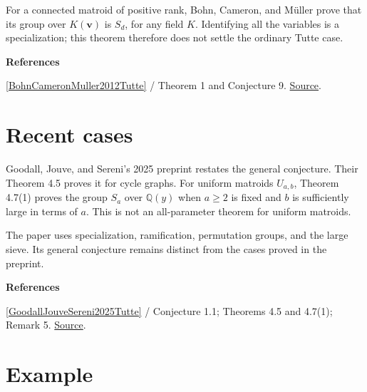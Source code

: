 \documentclass[11pt,a4paper,oneside,openany]{book}
\newcommand{\atlasdisplay}[1]{\par\begingroup\centering\vspace{3pt}\noindent\adjustbox{max width=\linewidth}{\(\displaystyle #1\)}\par\vspace{5pt}\endgroup}
\newenvironment{sources}{\par\smallskip\begingroup\footnotesize\color{atlasgray}\leftskip=10pt\setlength{\parskip}{2pt}}{\par\endgroup\smallskip}
\begin{document}
\atlasdisplay{\widehat Z_M(q,\mathbf v)=\sum_{A\subseteq E}q^{d-r(A)}\prod_{e\in A}v_e.}
\color{black} For a connected matroid of positive rank, Bohn, Cameron, and Müller prove that its group over \(K(\mathbf v)\) is \(S_d\), for any field \(K\). Identifying all the variables is a specialization; this theorem therefore does not settle the ordinary Tutte case.\par
\begin{sources}
\textbf{References}\par\smallskip
\noindent\hyperlink{ref:BohnCameronMuller2012Tutte}{[BohnCameronMuller2012Tutte]} / Theorem 1 and Conjecture 9.  \href{https://doi.org/10.1007/s10801-011-0332-2}{Source}.\par
\end{sources}\color{black}
\section{Recent cases}
\color{black} Goodall, Jouve, and Sereni's 2025 preprint restates the general conjecture. Their Theorem 4.5 proves it for cycle graphs. For uniform matroids \(U_{a,b}\), Theorem 4.7(1) proves the group \(S_a\) over \(\mathbb Q(y)\) when \(a\ge2\) is fixed and \(b\) is sufficiently large in terms of \(a\). This is not an all-parameter theorem for uniform matroids.\par
\color{black} The paper uses specialization, ramification, permutation groups, and the large sieve. Its general conjecture remains distinct from the cases proved in the preprint.\par
\begin{sources}
\textbf{References}\par\smallskip
\noindent\hyperlink{ref:GoodallJouveSereni2025Tutte}{[GoodallJouveSereni2025Tutte]} / Conjecture 1.1; Theorems 4.5 and 4.7(1); Remark 5.  \href{https://arxiv.org/abs/2510.05658}{Source}.\par
\end{sources}\color{black}
\section{Example}
\end{document}
